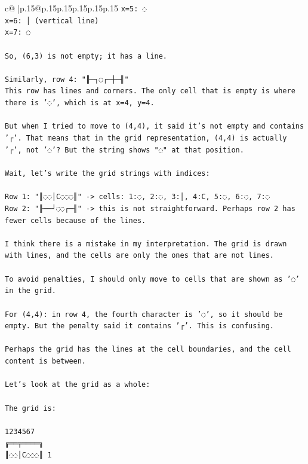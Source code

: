 \documentclass{article}
\begin{document}
{\begin{supertabular}{c@{$\;$}|p{.15\linewidth}@{}p{.15\linewidth}p{.15\linewidth}p{.15\linewidth}p{.15\linewidth}p{.15\linewidth}}
{{{\texttt{x=5: ◌} \\
\texttt{x=6: │ (vertical line)} \\
\texttt{x=7: ◌} \\
\\ 
\texttt{So, (6,3) is not empty; it has a line.} \\
\\ 
\texttt{Similarly, row 4: "╟─┐◌┌─┼─╢"} \\
\texttt{This row has lines and corners. The only cell that is empty is where there is '◌', which is at x=4, y=4.} \\
\\ 
\texttt{But when I tried to move to (4,4), it said it's not empty and contains '┌'. That means that in the grid representation, (4,4) is actually '┌', not '◌'? But the string shows "◌" at that position.} \\
\\ 
\texttt{Wait, let's write the grid strings with indices:} \\
\\ 
\texttt{Row 1: "║◌◌│C◌◌◌║"  {-}> cells: 1:◌, 2:◌, 3:│, 4:C, 5:◌, 6:◌, 7:◌} \\
\texttt{Row 2: "╟──┘◌◌┌─╢" {-}> this is not straightforward. Perhaps row 2 has fewer cells because of the lines.} \\
\\ 
\texttt{I think there is a mistake in my interpretation. The grid is drawn with lines, and the cells are only the ones that are not lines.} \\
\\ 
\texttt{To avoid penalties, I should only move to cells that are shown as '◌' in the grid.} \\
\\ 
\texttt{For (4,4): in row 4, the fourth character is '◌', so it should be empty. But the penalty said it contains '┌'. This is confusing.} \\
\\ 
\texttt{Perhaps the grid has the lines at the cell boundaries, and the cell content is between.} \\
\\ 
\texttt{Let's look at the grid as a whole:} \\
\\ 
\texttt{The grid is:} \\
\\ 
\texttt{1234567} \\
\texttt{╔══╤════╗} \\
\texttt{║◌◌│C◌◌◌║ 1} \\
}}}
\end{supertabular}}
\end{document}
